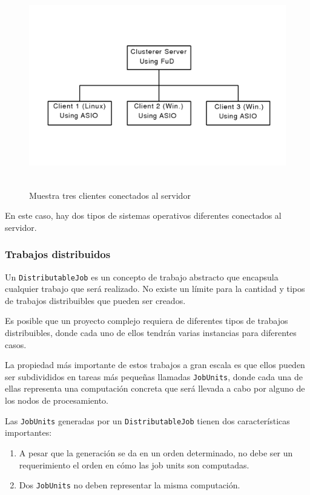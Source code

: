 \begin{figure}[H]
\begin{center}
  \includegraphics[height=3.5in,width=5.0in]{images/FuD-fig1.png}
\caption{Muestra tres clientes conectados al servidor}
\label{fig:Client-Server}
\end{center}
\end{figure} 

En este caso, hay dos tipos de sistemas operativos diferentes conectados al servidor.

\subsubsection{Trabajos distribuidos}

Un \texttt{DistributableJob} es un concepto de trabajo abstracto que encapsula cualquier trabajo que será realizado. No existe un límite para la cantidad y tipos
 de trabajos distribuibles que pueden ser creados. 

Es posible que un proyecto complejo requiera de diferentes tipos de trabajos distribuibles,
 donde cada uno de ellos tendrán varias instancias para diferentes casos.

La propiedad más importante de estos trabajos a gran escala es que ellos pueden ser subdivididos en tareas más pequeñas llamadas \texttt{JobUnits},
 donde cada una de ellas representa una computación concreta que será llevada a cabo por alguno de los nodos de procesamiento.

Las \texttt{JobUnits} generadas por un \texttt{DistributableJob} tienen dos características importantes:
\begin{enumerate}
 \item  A pesar que la generación se da en un orden determinado, no debe ser un requerimiento el orden en cómo las job units son computadas.
\item  Dos \texttt{JobUnits} no deben representar la misma computación.
\end{enumerate}

